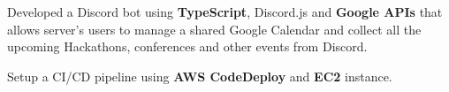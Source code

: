 \begin{tightemize}
  \item Developed a Discord bot using {\bf TypeScript}, Discord.js and {\bf Google APIs} that allows server's users to manage a shared Google Calendar and collect all the upcoming Hackathons, conferences and other events from Discord.
  \item Setup a CI/CD pipeline using {\bf AWS CodeDeploy} and {\bf EC2} instance.
\end{tightemize}